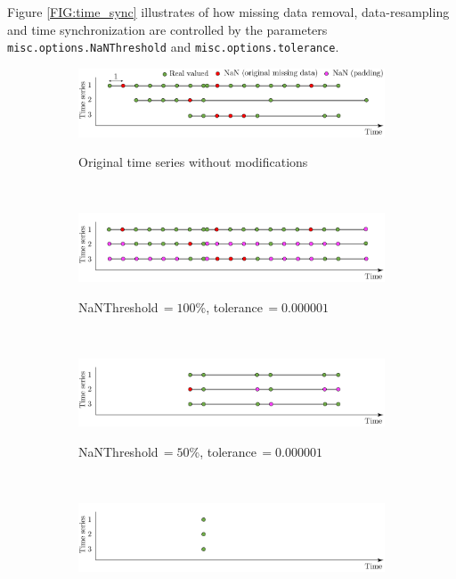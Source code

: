Figure \ref{FIG:time_sync} illustrates of how missing data removal, data-resampling and time synchronization are controlled by the parameters  \lstinline[basicstyle = \mlttfamily \small ]!misc.options.NaNThreshold! and \lstinline[basicstyle = \mlttfamily \small ]!misc.options.tolerance!.
\begin{figure}[htbp]
\begin{subfigure}{\linewidth}\centering
\includegraphics[width=0.9\linewidth]{./docfigs/time_synchro_1.pdf}\\[-8pt]
\caption{Original time series without modifications}
\end{subfigure}\\[12pt]
\begin{subfigure}{\linewidth}\centering
\includegraphics[width=0.9\linewidth]{./docfigs/time_synchro_2.pdf}\\[-8pt]
\caption{NaNThreshold$\,=100$\%, tolerance$\,=0.000001$}
\end{subfigure}\\[12pt]
\begin{subfigure}{\linewidth}\centering
\includegraphics[width=0.9\linewidth]{./docfigs/time_synchro_3.pdf} \\[-8pt]
\caption{NaNThreshold$\,=50$\%, tolerance$\,=0.000001$}
\end{subfigure}\\[12pt]
\begin{subfigure}{\linewidth}\centering
\includegraphics[width=0.9\linewidth]{./docfigs/time_synchro_4.pdf} \\[-8pt]

\end{subfigure}
\end{figure}
